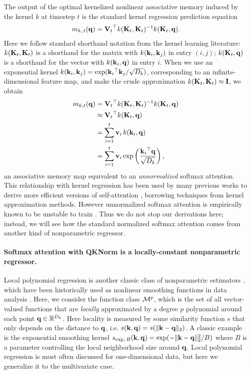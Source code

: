 \documentclass[notitlepage, 11pt]{article}
\newcommand*{\memory}{{m}}
\newcommand*{\dkey}{{D_k}}
\begin{document}
The output of the optimal kernelized nonlinear associative memory induced by the kernel $k$ at timestep $t$ is the standard kernel regression prediction equation \citep{Scholkopf2001LearningKernelsSupport}
\begin{align}
   \memory_{k,\, t}(\qbf) = \Vbf_t\transpose k(\Kbf_t, \Kbf_t)\inverse k(\Kbf_t, \qbf).
\end{align}
Here we follow standard shorthand notation from the kernel learning literature: $k(\mathbf{K}_t, \mathbf{K}_t)$ is a shorthand for the matrix with $k(\mathbf{k}_i, \mathbf{k}_j)$ in entry $(i,j)$; $k(\mathbf{K}_t, \mathbf{q})$ is a shorthand for the vector with $k(\mathbf{k}_i, \mathbf{q})$ in entry $i$.
When we use an exponential kernel $k(\kbf_i, \kbf_j) = \exp(\kbf_i\transpose\kbf_j/\sqrt{\dkey})$, corresponding to an infinite-dimensional feature map, and make the crude approximation $k(\mathbf{K}_t, \mathbf{K}_t) \approx \mathbf{I}$, we obtain
\begin{align}
    \memory_{k, t}(\qbf) &= \Vbf_t\transpose k(\Kbf_t, \Kbf_t)\inverse k(\Kbf_t, \qbf) \\
    &\approx \Vbf_t\transpose k(\Kbf_t,\qbf) \\
    &= \sum_{i=1}^t \vbf_i\, k(\kbf_i, \qbf) \\
    &= \sum_{i=1}^t \vbf_i \exp\left(\frac{\kbf_i\transpose\qbf}{\sqrt{\dkey}}\right),
\end{align}
an associative memory map equivalent to an \emph{unnormalized} softmax attention.
This relationship with kernel regression has been used by many previous works to derive more efficient versions of self-attention \citep{Peng2020RandomFeatureAttention,Chen2021SkyformerRemodelSelfattention,Choromanski2020RethinkingAttentionPerformers,Lu2021SOFTSoftmaxfreeTransformer,Chen2024DiJiangEfficientLarge}, borrowing techniques from kernel approximation methods.
However unnormalized softmax attention is empirically known to be unstable to train \citep{Lu2021SOFTSoftmaxfreeTransformer}.
Thus we do not stop our derivations here; instead, we will see how the standard normalized softmax attention comes from another kind of nonparametric regressor.

\paragraph{Softmax attention with QKNorm is a locally-constant nonparametric regressor.}
Local polynomial regression is another classic class of nonparametric estimators \citep{Wasserman2006AllNonparametricStatistics}, which have been historically used as nonlinear smoothing functions in data analysis \citep{Fan2018LocalPolynomialModelling}.
Here, we consider the function class $\mathcal{M}^p$, which is the set of all vector-valued functions that are \emph{locally} approximated by a degree $p$ polynomial around each point $\qbf \in \reals^\dkey$. Here locality is measured by some similarity function $s$ that only depends on the distance to $\mathbf{q}$, i.e. $s(\mathbf{k}, \mathbf{q}) = s(\lVert\mathbf{k} - \mathbf{q}\rVert_2)$.
A classic example is the exponential smoothing kernel $s_{\text{exp},\, B}(\mathbf{k}, \mathbf{q}) = \exp(-\lVert\mathbf{k} - \mathbf{q}\rVert_2^2/B)$ where $B$ is a parameter controlling the local neighborhood size around $\mathbf{q}$.
Local polynomial regression is most often discussed for one-dimensional data, but here we generalize it to the multivariate case.
\end{document}
